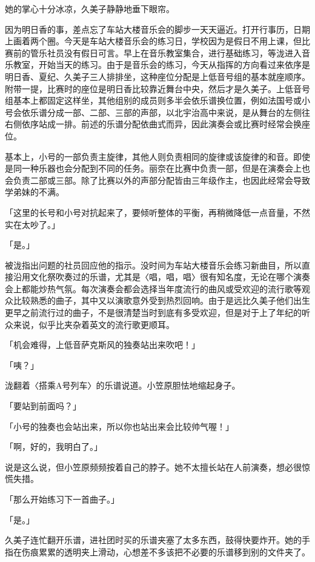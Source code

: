 \documentclass[UTF8]{ctexart}
\begin{document}
    她的掌心十分冰凉，久美子静静地垂下眼帘。 

    因为明日香的事，差点忘了车站大楼音乐会的脚步一天天逼近。打开行事历，日期上画着两个圈。今天是车站大楼音乐会的练习日，学校因为是假日不用上课，但比赛前的管乐社员没有假日可言。早上在音乐教室集合，进行基础练习，等泷进入音乐教室，开始当天的练习。由于是音乐会的练习，今天从指挥的方向看过来依序是明日香、夏纪、久美子三人排排坐，这种座位分配是上低音号组的基本就座顺序。附带一提，比赛时的座位是明日香比较靠近舞台中央，然后才是久美子。上低音号组基本上都固定这样坐，其他组别的成员则多半会依乐谱换位置，例如法国号或小号会依乐谱分成一部、二部、三部的声部，以北宇治高中来说，是从舞台的左侧往右侧依序站成一排。前述的乐谱分配依曲式而异，因此演奏会或比赛时经常会换座位。 

    基本上，小号的一部负责主旋律，其他人则负责相同的旋律或该旋律的和音。即使是同一种乐器也会分配到不同的任务。丽奈在比赛中负责一部，但是在演奏会上也会负责二部或三部。除了比赛以外的声部分配皆由三年级作主，也因此经常会导致学弟妹的不满。 

    「这里的长号和小号对抗起来了，要倾听整体的平衡，再稍微降低一点音量，不然实在太吵了。」 

    「是。」 

    被泷指出问题的社员回应他的指示。没时间为车站大楼音乐会练习新曲目，所以直接沿用文化祭吹奏过的乐谱，尤其是〈唱，唱，唱〉很有知名度，无论在哪个演奏会上都能炒热气氛。每次演奏会都会选择当年度流行的曲风或受欢迎的流行歌等观众比较熟悉的曲子，其中又以演歌意外受到热烈回响。由于是远比久美子他们出生更早之前流行过的曲子，不是很清楚当时到底有多受欢迎，但是对于上了年纪的听众来说，似乎比夹杂着英文的流行歌更顺耳。 

    「机会难得，上低音萨克斯风的独奏站出来吹吧！」 

    「咦？」 

    泷翻着〈搭乘A号列车〉的乐谱说道。小笠原胆怯地缩起身子。 

    「要站到前面吗？」 

    「小号的独奏也会站出来，所以你也站出来会比较帅气喔！」 

    「啊，好的，我明白了。」 

    说是这么说，但小笠原频频按着自己的脖子。她不太擅长站在人前演奏，想必很惊慌失措。 

    「那么开始练习下一首曲子。」 

    「是。」 

    久美子连忙翻开乐谱，进社团时买的乐谱夹塞了太多东西，鼓得快要炸开。她的手指在伤痕累累的透明夹上滑动，心想差不多该把不必要的乐谱移到别的文件夹了。 
\end{document}
